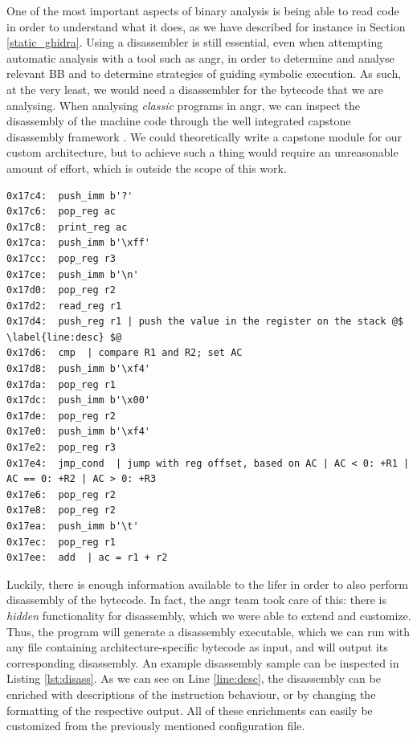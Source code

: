 One of the most important aspects of binary analysis is being able to read code in order to understand what it does, as we have described for instance in Section \ref{static_ghidra}. Using a disassembler is still essential, even when attempting automatic analysis with a tool such as angr, in order to determine and analyse relevant \gls{BB} and to determine strategies of guiding symbolic execution. As such, at the very least, we would need a disassembler for the bytecode that we are analysing. When analysing \emph{classic} programs in angr, we can inspect the disassembly of the machine code through the well integrated capstone disassembly framework \cite{capstone}. We could theoretically write a capstone module for our custom architecture, but to achieve such a thing would require an unreasonable amount of effort, which is outside the scope of this work.

\begin{lstlisting}[label={lst:disass}, caption={Disassembly from a section of bytecode extracted from the \cc{vmcastle} sample. The disassembler itself is generated with the \cc{arch-genesis} tool.}]
0x17c4:  push_imm b'?'
0x17c6:  pop_reg ac
0x17c8:  print_reg ac
0x17ca:  push_imm b'\xff'
0x17cc:  pop_reg r3
0x17ce:  push_imm b'\n'
0x17d0:  pop_reg r2
0x17d2:  read_reg r1
0x17d4:  push_reg r1 | push the value in the register on the stack @$ \label{line:desc} $@
0x17d6:  cmp  | compare R1 and R2; set AC
0x17d8:  push_imm b'\xf4'
0x17da:  pop_reg r1
0x17dc:  push_imm b'\x00'
0x17de:  pop_reg r2
0x17e0:  push_imm b'\xf4'
0x17e2:  pop_reg r3
0x17e4:  jmp_cond  | jump with reg offset, based on AC | AC < 0: +R1 | AC == 0: +R2 | AC > 0: +R3
0x17e6:  pop_reg r2
0x17e8:  pop_reg r2
0x17ea:  push_imm b'\t'
0x17ec:  pop_reg r1
0x17ee:  add  | ac = r1 + r2
\end{lstlisting}

Luckily, there is enough information available to the lifer in order to also perform disassembly of the bytecode. In fact, the angr team took care of this: there is \emph{hidden} functionality for disassembly, which we were able to extend and customize. Thus, the  program will generate a disassembly executable, which we can run with any file containing architecture-specific bytecode as input, and will output its corresponding disassembly. An example disassembly sample can be inspected in Listing \ref{lst:disass}. As we can see on Line \ref{line:desc}, the disassembly can be enriched with descriptions of the instruction behaviour, or by changing the formatting of the respective output. All of these enrichments can easily be customized from the previously mentioned  configuration file.

